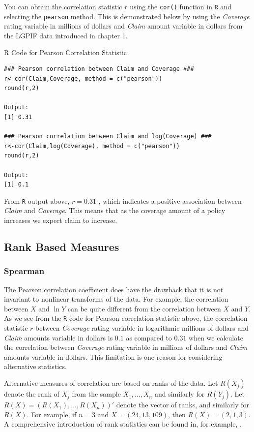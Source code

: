 \documentclass[]{book}
\theoremstyle{definition}
\theoremstyle{definition}
\theoremstyle{definition}
\theoremstyle{remark}
\begin{document}
You can obtain the correlation statistic \(r\) using the \texttt{cor()}
function in \texttt{R} and selecting the \texttt{pearson} method. This
is demonstrated below by using the \emph{Coverage} rating variable in
millions of dollars and \emph{Claim} amount variable in dollars from the
LGPIF data introduced in chapter 1.

R Code for Pearson Correlation Statistic

\hypertarget{display.pearson.2}{}
\begin{verbatim}
### Pearson correlation between Claim and Coverage ###
r<-cor(Claim,Coverage, method = c("pearson"))
round(r,2)

Output:
[1] 0.31

### Pearson correlation between Claim and log(Coverage) ###
r<-cor(Claim,log(Coverage), method = c("pearson"))
round(r,2)

Output:
[1] 0.1
\end{verbatim}

From \texttt{R} output above, \(r=0.31\) , which indicates a positive
association between \emph{Claim} and \emph{Coverage}. This means that as
the coverage amount of a policy increases we expect claim to increase.

\subsection{Rank Based Measures}\label{rank-based-measures}

\subsubsection{Spearman}\label{spearman}

The Pearson correlation coefficient does have the drawback that it is
not invariant to nonlinear transforms of the data. For example, the
correlation between \(X\) and \(\ln Y\) can be quite different from the
correlation between \(X\) and \(Y\). As we see from the \texttt{R} code
for Pearson correlation statistic above, the correlation statistic \(r\)
between \emph{Coverage} rating variable in logarithmic millions of
dollars and \emph{Claim} amounts variable in dollars is \(0.1\) as
compared to \(0.31\) when we calculate the correlation between
\emph{Coverage} rating variable in millions of dollars and \emph{Claim}
amounts variable in dollars. This limitation is one reason for
considering alternative statistics.

Alternative measures of correlation are based on ranks of the data. Let
\(R(X_j)\) denote the rank of \(X_j\) from the sample
\(X_1, \ldots, X_n\) and similarly for \(R(Y_j)\). Let
\(R(X) = \left(R(X_1), \ldots, R(X_n)\right)'\) denote the vector of
ranks, and similarly for \(R(X)\). For example, if \(n=3\) and
\(X=(24, 13, 109)\), then \(R(X)=(2,1,3)\). A comprehensive introduction
of rank statistics can be found in, for example,
\citep{hettmansperger1984statistical}.
\end{document}
